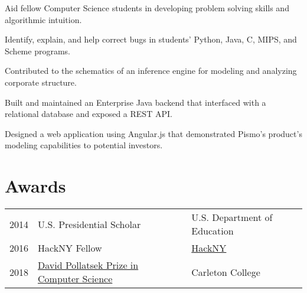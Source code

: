 \documentclass{resume}
\begin{document}
\begin{minipage}[t]{0.66\textwidth}
\begin{tightemize}
\item Aid fellow Computer Science students in developing problem solving skills and algorithmic intuition.
\item Identify, explain, and help correct bugs in students’ Python, Java, C, MIPS, and Scheme programs.
\end{tightemize}
\sectionsep

\begin{tightemize}
\item Contributed to the schematics of an inference engine for modeling and analyzing corporate structure.
\item Built and maintained an Enterprise Java backend that interfaced with a relational database and exposed a REST API.
\item Designed a web application using Angular.js that demonstrated Pismo's product's modeling capabilities to potential investors.
\end{tightemize}
\sectionsep




\section{Awards}
\begin{tabular}{rll}
  2014 & U.S. Presidential Scholar & U.S. Department of Education \\
  2016 & HackNY Fellow & \href{https://apply.hackny.org}{HackNY} \\
  2018 & \href{https://apps.carleton.edu/curricular/cs/major/awards/pollatsek/}{David Pollatsek Prize in Computer Science} & Carleton College \\
\end{tabular}
\sectionsep

\end{minipage}
\end{document}
